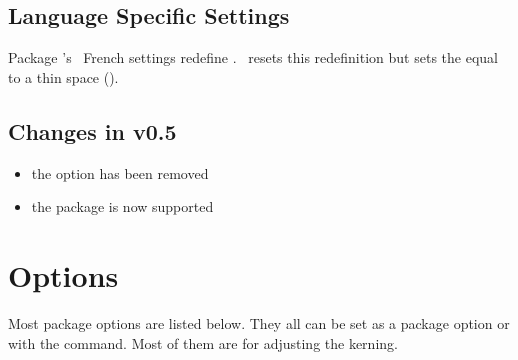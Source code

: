 \documentclass[load-preamble+]{cnltx-doc}
\begin{document}
\subsection{Language Specific Settings}
Package 's~\cite{pkg:babel} French settings redefine
.  \fnpct\ resets this redefinition but sets the
 equal to a thin space (\code{.16667em}).

\subsection{Changes in v0.5}\label{ssec:news}

\begin{itemize}
  \item the option  has been removed
  \item the  package is now supported
\end{itemize}

\section{Options}\label{sec:options}
Most package options are listed below.  They all can be set as a package
option or with the  command.  Most of them are for adjusting the
kerning.
\end{document}

